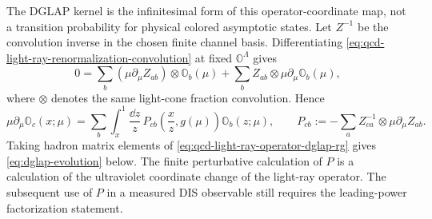 The DGLAP kernel is the infinitesimal form of this operator-coordinate map,
not a transition probability for physical colored asymptotic states.  Let
\(Z^{-1}\) be the convolution inverse in the chosen finite channel basis.
Differentiating
\eqref{eq:qcd-light-ray-renormalization-convolution} at fixed
\(\mathbb O^\Lambda\) gives
\[
  0
  =
  \sum_b(\mu\partial_\mu Z_{ab})\otimes\mathbb O_b(\mu)
  +
  \sum_b Z_{ab}\otimes\mu\partial_\mu\mathbb O_b(\mu),
\]
where \(\otimes\) denotes the same light-cone fraction convolution.  Hence
\begin{equation}
  \mu\partial_\mu\mathbb O_c(x;\mu)
  =
  \sum_b
  \int_x^1\frac{\dd z}{z}\,
  P_{cb}\!\left(\frac{x}{z},g(\mu)\right)
  \mathbb O_b(z;\mu),
  \qquad
  P_{cb}:=
  -\sum_a Z^{-1}_{ca}\otimes\mu\partial_\mu Z_{ab}.
  \label{eq:qcd-light-ray-operator-dglap-rg}
\end{equation}
Taking hadron matrix elements of
\eqref{eq:qcd-light-ray-operator-dglap-rg} gives
\eqref{eq:dglap-evolution} below.  The finite perturbative calculation of
\(P\) is a calculation of the ultraviolet coordinate change of the light-ray
operator.  The subsequent use of \(P\) in a measured DIS observable still
requires the leading-power factorization statement.


